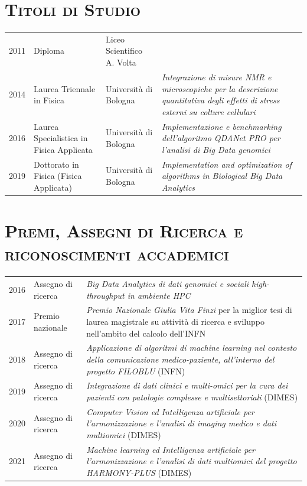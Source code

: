 \documentclass[a4paper,11pt]{article}
\begin{document}
\newpage

\section*{\scshape{Titoli di Studio}}

\begin{tabular}{lp{4cm}lp{8cm}}
  2011 & Diploma                                  & Liceo Scientifico A. Volta & \\
  2014 & Laurea Triennale in Fisica               & Università di Bologna      & \emph{Integrazione di misure NMR e microscopiche per la descrizione quantitativa degli effetti di stress esterni su colture cellulari} \\
  2016 & Laurea Specialistica in Fisica Applicata & Università di Bologna      & \emph{Implementazione e benchmarking dell'algoritmo QDANet PRO per l'analisi di Big Data genomici} \\
  2019 & Dottorato in Fisica (Fisica Applicata)   & Università di Bologna      & \emph{Implementation and optimization of algorithms in Biological Big Data Analytics} \\
\end{tabular}



\vspace*{0.5cm}
\section*{\scshape{Premi, Assegni di Ricerca e riconoscimenti accademici}}

\begin{tabular}{llp{10cm}}

  2016 & Assegno di ricerca & \emph{Big Data Analytics di dati genomici e sociali high-throughput in ambiente HPC} \\
  2017 & Premio nazionale   & \emph{Premio Nazionale Giulia Vita Finzi} per la miglior tesi di laurea magistrale su attività di ricerca e sviluppo nell'ambito del calcolo dell'INFN\\
  2018 & Assegno di ricerca & \emph{Applicazione di algoritmi di machine learning nel contesto della comunicazione medico-paziente, all'interno del progetto FILOBLU} (INFN)\\
  2019 & Assegno di ricerca & \emph{Integrazione di dati clinici e multi-omici per la cura dei pazienti con patologie complesse e multisettoriali} (DIMES)\\
  2020 & Assegno di ricerca & \emph{Computer Vision ed Intelligenza artificiale per l'armonizzazione e l'analisi di imaging medico e dati multiomici} (DIMES)\\
  2021 & Assegno di ricerca & \emph{Machine learning ed Intelligenza artificiale per l'armonizzazione e l'analisi di dati multiomici del progetto HARMONY-PLUS} (DIMES)\\

\end{tabular}
\end{document}
